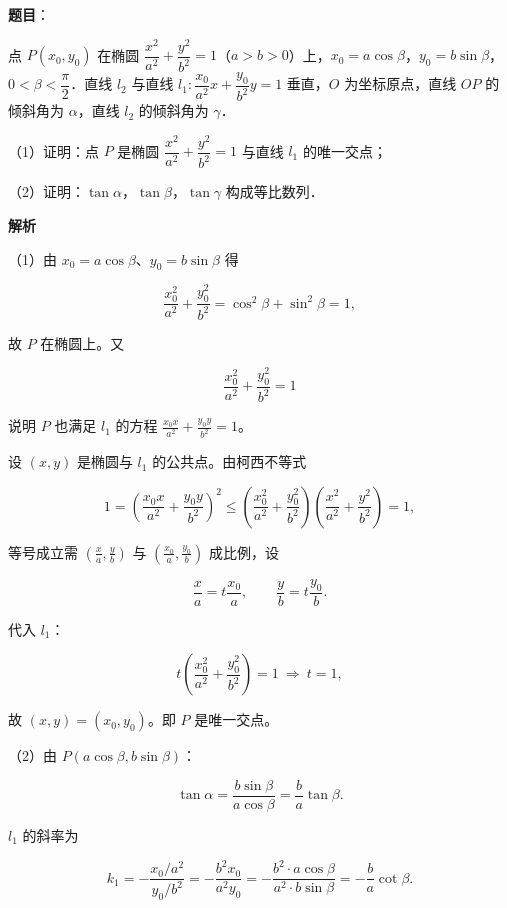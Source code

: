 \begin{answer}

\textbf{题目}：

点 $P(x_0,y_0)$ 在椭圆 $\dfrac{x^2}{a^2}+\dfrac{y^2}{b^2}=1$（$a>b>0$）上，$x_0=a\cos\beta$，$y_0=b\sin\beta$，$0<\beta<\dfrac{\pi}{2}$．直线 $l_2$ 与直线 $l_1:\dfrac{x_0}{a^2}x+\dfrac{y_0}{b^2}y=1$ 垂直，$O$ 为坐标原点，直线 $OP$ 的倾斜角为 $\alpha$，直线 $l_2$ 的倾斜角为 $\gamma$．

（1）证明：点 $P$ 是椭圆 $\dfrac{x^2}{a^2}+\dfrac{y^2}{b^2}=1$ 与直线 $l_1$ 的唯一交点；

（2）证明：$\tan\alpha$，$\tan\beta$，$\tan\gamma$ 构成等比数列．

\textbf{解析}

（1）由 $x_0=a\cos\beta$、$y_0=b\sin\beta$ 得

\nopagebreak[4]
\[\frac{x_0^2}{a^2}+\frac{y_0^2}{b^2}=\cos^2\beta+\sin^2\beta=1,\]

故 $P$ 在椭圆上。又

\nopagebreak[4]
\[\frac{x_0^2}{a^2}+\frac{y_0^2}{b^2}=1\]

说明 $P$ 也满足 $l_1$ 的方程 $\frac{x_0x}{a^2}+\frac{y_0y}{b^2}=1$。

设 $(x,y)$ 是椭圆与 $l_1$ 的公共点。由柯西不等式

\nopagebreak[4]
\[1=\left(\frac{x_0x}{a^2}+\frac{y_0y}{b^2}\right)^2
\leqslant\left(\frac{x_0^2}{a^2}+\frac{y_0^2}{b^2}\right)\left(\frac{x^2}{a^2}+\frac{y^2}{b^2}\right)=1,\]

等号成立需 $\left(\frac{x}{a},\frac{y}{b}\right)$ 与 $\left(\frac{x_0}{a},\frac{y_0}{b}\right)$ 成比例，设

\nopagebreak[4]
\[\frac xa=t\frac{x_0}{a},\qquad \frac yb=t\frac{y_0}{b}.\]

代入 $l_1$：

\nopagebreak[4]
\[t\left(\frac{x_0^2}{a^2}+\frac{y_0^2}{b^2}\right)=1\ \Longrightarrow\ t=1,\]

故 $(x,y)=(x_0,y_0)$。即 $P$ 是唯一交点。

（2）由 $P(a\cos\beta,b\sin\beta)$：

\nopagebreak[4]
\[\tan\alpha=\frac{b\sin\beta}{a\cos\beta}=\frac ba\tan\beta .\]

$l_1$ 的斜率为

\nopagebreak[4]
\[k_1=-\frac{x_0/a^2}{y_0/b^2}
=-\frac{b^2x_0}{a^2y_0}
=-\frac{b^2\cdot a\cos\beta}{a^2\cdot b\sin\beta}
=-\frac ba\cot\beta .\]


\end{answer}
